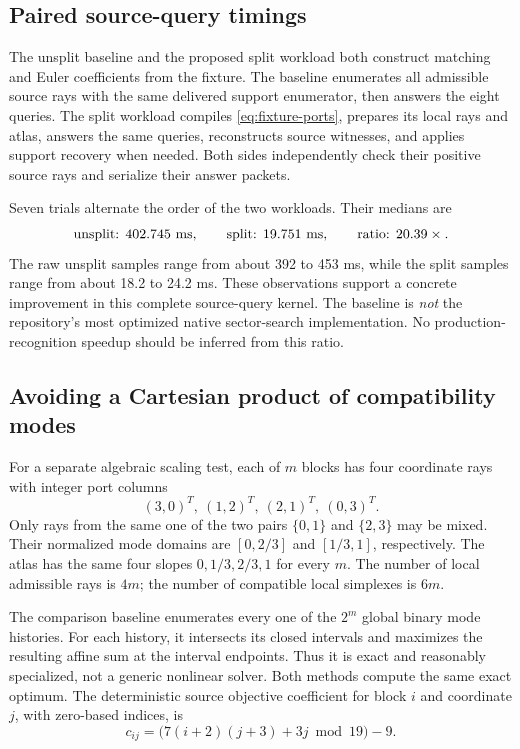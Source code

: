 \subsection{Paired source-query timings}
The unsplit baseline and the proposed split workload both construct matching and Euler coefficients from the fixture. The baseline enumerates all admissible source rays with the same delivered support enumerator, then answers the eight queries. The split workload compiles \eqref{eq:fixture-ports}, prepares its local rays and atlas, answers the same queries, reconstructs source witnesses, and applies support recovery when needed. Both sides independently check their positive source rays and serialize their answer packets.

Seven trials alternate the order of the two workloads. Their medians are
\[
 \text{unsplit: }402.745\text{ ms},\qquad
 \text{split: }19.751\text{ ms},\qquad
 \text{ratio: }20.39\times.
\]
The raw unsplit samples range from about 392 to 453 ms, while the split samples range from about 18.2 to 24.2 ms. These observations support a concrete improvement in this complete source-query kernel. The baseline is \emph{not} the repository's most optimized native sector-search implementation. No production-recognition speedup should be inferred from this ratio.

\subsection{Avoiding a Cartesian product of compatibility modes}
For a separate algebraic scaling test, each of $m$ blocks has four coordinate rays with integer port columns
\[
 (3,0)^T,\ (1,2)^T,\ (2,1)^T,\ (0,3)^T.
\]
Only rays from the same one of the two pairs $\{0,1\}$ and $\{2,3\}$ may be mixed. Their normalized mode domains are $[0,2/3]$ and $[1/3,1]$, respectively. The atlas has the same four slopes $0,1/3,2/3,1$ for every $m$. The number of local admissible rays is $4m$; the number of compatible local simplexes is $6m$.

The comparison baseline enumerates every one of the $2^m$ global binary mode histories. For each history, it intersects its closed intervals and maximizes the resulting affine sum at the interval endpoints. Thus it is exact and reasonably specialized, not a generic nonlinear solver. Both methods compute the same exact optimum. The deterministic source objective coefficient for block $i$ and coordinate $j$, with zero-based indices, is
\[
 c_{ij}=\bigl(7(i+2)(j+3)+3j\bmod19\bigr)-9.
\]

